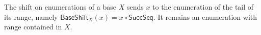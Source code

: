 \begin{definition}
The shift on enumerations of a base $X$ sends $x$ to the enumeration of
the tail of its range, namely $\mathsf{BaseShift}_X(x)=x\circ\mathsf{SuccSeq}$.
It remains an enumeration with range contained in $X$.
\end{definition}
